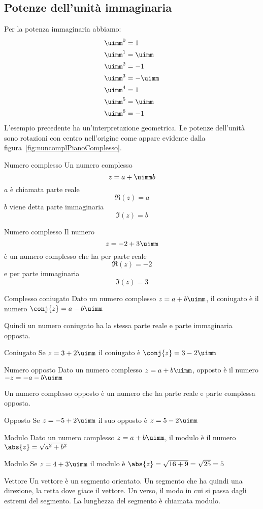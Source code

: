 \subsection{Potenze dell'unità immaginaria}
Per la potenza immaginaria abbiamo:
\begin{align*}
	&\uimm^0=1\\
	&\uimm^1=\uimm\\
	&\uimm^2=-1\\
	&\uimm^3=-\uimm\\
	&\uimm^4=1\\
	&\uimm^5=\uimm\\
	&\uimm^6=-1
\end{align*}
L'esempio precedente ha un'interpretazione geometrica. Le potenze dell'unità sono rotazioni  con  centro nell'origine come appare evidente dalla figura~\vref{fig:nuncomplPianoComplesso}.
\begin{definizionet}{Numero complesso}{}
	 Un numero complesso  \[z=a+\uimm b\] $a$ è chiamata parte reale \[\Re\left(z\right)=a\]
	$b$ viene detta  parte immaginaria\[\Im\left(z\right)=b \] 
\end{definizionet}
\begin{esempiot}{Numero complesso}{}
Il numero \[z=-2+3\uimm \] è un numero complesso che ha per parte reale \[\Re(z)=-2\]  e per parte immaginaria \[\Im(z)=3\]
\end{esempiot}
\begin{definizionet}{Complesso coniugato}{}
	Dato un numero complesso $z=a+b\uimm$, il coniugato è  il numero $\conj{z}=a-b\uimm$
\end{definizionet}
Quindi un numero coniugato ha la stessa parte reale e parte immaginaria opposta.
\begin{esempiot}{Coniugato}{}
Se $z=3+2\uimm$ il coniugato è $\conj{z}=3-2\uimm$ 
\end{esempiot}
\begin{definizionet}{Numero opposto}{}
Dato un numero complesso $z=a+b\uimm$,  opposto 
è  il numero $-z=-a-b\uimm$
\end{definizionet}
Un numero complesso opposto è un numero che ha parte reale e parte complessa 
opposta.
\begin{esempiot}{Opposto}{}
	Se $z=-5+2\uimm$ il suo opposto è $z=5-2\uimm$
\end{esempiot}
\begin{definizionet}{Modulo}{}
Dato un numero  complesso $z=a+b\uimm$, il modulo è il numero $\abs{z}=\sqrt{a^2+b^2}$
\end{definizionet}
\begin{esempiot}{Modulo}{}
	Se $z=4+3\uimm$ il modulo è $\abs{z}=\sqrt{16+9}=\sqrt{25}=5$
\end{esempiot}
\begin{definizionet}{Vettore}{}
	Un vettore è un segmento orientato. Un segmento che ha 
	quindi una direzione, la retta dove giace il vettore. Un verso, il modo in 
	cui si passa dagli estremi del segmento. 
	La lunghezza del segmento è chiamata modulo.
\end{definizionet}

